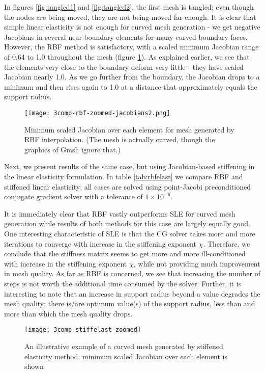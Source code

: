  In figures \ref{fig:tangled1} and \ref{fig:tangled2}, the first mesh is tangled; even though the nodes are being moved, they are not being moved far enough. It is clear that simple linear elasticity is not enough for curved mesh generation - we get negative Jacobians in several near-boundary elements for many curved boundary faces. However, the RBF method is satisfactory, with a scaled minimum Jacobian range of 0.64 to 1.0 throughout the mesh (figure \ref{fig:rbf-jacobians}). As explained earlier, we see that the elements very close to the boundary deform very little - they have scaled Jacobian nearly 1.0. As we go further from the boundary, the Jacobian drops to a minimum and then rises again to 1.0 at a distance that approximately equals the support radius.
 
 \begin{figure}
 	\centering
 	\texttt{[image: 3comp-rbf-zoomed-jacobians2.png]}
 	\caption{Minimum scaled Jacobian over each element for mesh generated by RBF interpolation. (The mesh is actually curved, though the graphics of Gmsh ignore that.)}
 	\label{fig:rbf-jacobians}
 \end{figure}

Next, we present results of the same case, but using Jacobian-based stiffening in the linear elasticity formulation. In table \ref{tab:rbfelast} we compare RBF and stiffened linear elasticity; all cases are solved using point-Jacobi preconditioned conjugate gradient solver with a tolerance of $1\times 10^{-6}$.

It is immediately clear that RBF vastly outperforms SLE for curved mesh generation while results of both methods for this case are largely equally good. One interesting characteristic of SLE is that the CG solver takes more and more iterations to converge with increase in the stiffening exponent $\chi$. Therefore, we conclude that the stiffness matrix seems to get more and more ill-conditioned with increase in the stiffening exponent $\chi$, while not providing much improvement in mesh quality. As far as RBF is concerned, we see that increasing the number of steps is not worth the additional time consumed by the solver. Further, it is interesting to note that an increase in support radius beyond a value degrades the mesh quality; there is/are optimum value(s) of the support radius, less than and more than which the mesh quality drops.

\begin{figure}
 	\centering
 	\texttt{[image: 3comp-stiffelast-zoomed]}
 	\caption{An illustrative example of a curved mesh generated by stiffened elasticity method; minimum scaled Jacobian over each element is shown}
 	\label{fig:3compstiffelast}
\end{figure}

